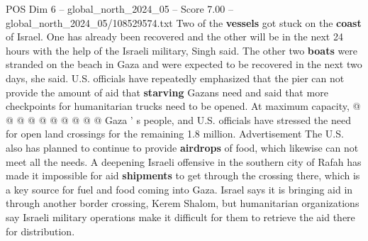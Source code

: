 \begin{textsample}{POS Dim 6 – global\_north\_2024\_05 – Score 7.00 – global\_north\_2024\_05/108529574.txt}
Two of the \textbf{vessels} got stuck on the \textbf{coast} of Israel.
One has already been recovered and the other will be in the next 24 hours with the help of the Israeli military, Singh said.
The other two \textbf{boats} were stranded on the beach in Gaza and were expected to be recovered in the next two days, she said.
U.S. officials have repeatedly emphasized that the pier can not provide the amount of aid that \textbf{starving} Gazans need and said that more checkpoints for humanitarian trucks need to be opened.
At maximum capacity, @ @ @ @ @ @ @ @ @ @ Gaza ' s people, and U.S. officials have stressed the need for open land crossings for the remaining 1.8 million.
Advertisement The U.S. also has planned to continue to provide \textbf{airdrops} of food, which likewise can not meet all the needs.
A deepening Israeli offensive in the southern city of Rafah has made it impossible for aid \textbf{shipments} to get through the crossing there, which is a key source for fuel and food coming into Gaza.
Israel says it is bringing aid in through another border crossing, Kerem Shalom, but humanitarian organizations say Israeli military operations make it difficult for them to retrieve the aid there for distribution.

\end{textsample}
